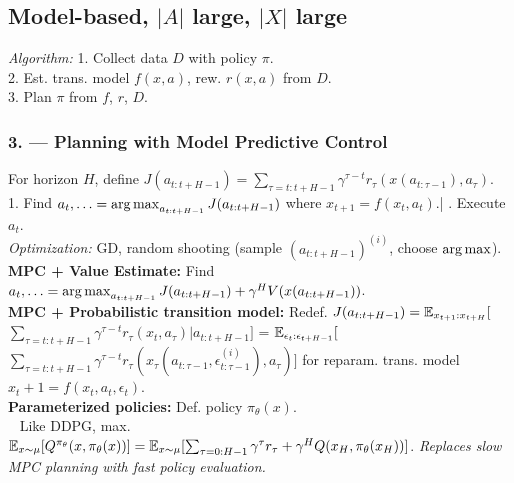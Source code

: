 \subsection*{Model-based, $|A|$ large, $|X|$ large}
\emph{Algorithm:} 1. Collect data $D$ with policy $\pi$.\\
2. Est. trans. model $f(x,a)$, rew. $r(x,a)$ from $D$.\\
3. Plan $\pi$ from $f$, $r$, $D$.{\tiny\CircArrowRight{}}
\subsubsection*{3. --- Planning with Model Predictive Control}
For horizon $H$, define $J(a_{t:t+H-1})=\sum_{\tau=t:t+H-1}\gamma^{\tau-t}r_\tau(x(a_{t:\tau-1}), a_\tau)$.\\
1. Find $a_t,\ldots = \operatorname*{arg\,max}_{a_{t:t+H-1}}J(a_{t:t+H-1})$ where
$x_{t+1} = f(x_t, a_t)$.\quad | . Execute $a_t$.{\tiny\CircArrowRight{}}\\
\emph{Optimization:} GD, random shooting (sample $(a_{t:{t+H-1}})^{(i)}$, choose $\color{black}\operatorname*{arg\,max}$).\\
\textbf{MPC + Value Estimate:} Find $a_t,\ldots = \operatorname*{arg\,max}_{a_{t:t+H-1}}J(a_{t:t+H-1})+\gamma^H V(x(a_{t:t+H-1}))$.\\
\textbf{MPC + Probabilistic transition model:}
Redef. $J(a_{t:t+H-1})=\mathbb{E}_{x_{t+1}:x_{t+H}}[$\\$\sum_{\tau=t:t+H-1}\gamma^{\tau-t}r_\tau(x_t, a_\tau)|a_{t:t+H-1}]$ = $\mathbb{E}_{\epsilon_{t}:\epsilon_{t+H-1}}[$\\$\sum_{\tau=t:t+H-1}\gamma^{\tau-t}r_\tau(x_\tau(a_{t:\tau-1},\epsilon^{(i)}_{t:\tau-1}), a_\tau)]$ for reparam. trans. model $x_t+1 = f(x_t,a_t,\epsilon_t)$.\\
\textbf{Parameterized policies:}
Def. policy $\pi_\theta(x)$.\\
\hphantom\,\,\,\,\,Like DDPG, max. $\mathbb{E}_{x\sim\mu}[Q^{\pi_\theta}(x,\pi_\theta(x))] = \mathbb{E}_{x\sim\mu}[\sum_{\tau=0:H-1}\gamma^\tau r_\tau + \gamma^H Q(x_{H}, \pi_\theta(x_H))]$.
\emph{Replaces slow MPC planning with fast policy evaluation.}

